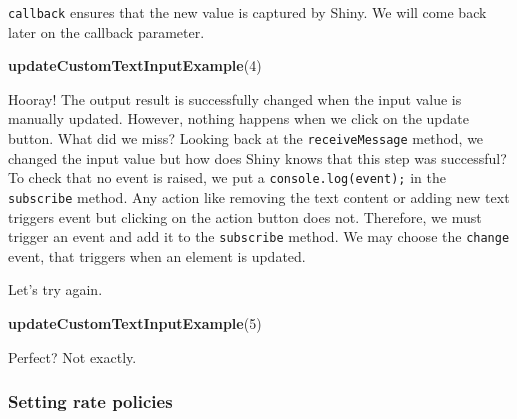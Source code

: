 \documentclass[
]{book}
\newenvironment{Shaded}{\begin{snugshade}}{\end{snugshade}}
\newcommand{\AttributeTok}[1]{\textcolor[rgb]{0.77,0.63,0.00}{#1}}
\newcommand{\DecValTok}[1]{\textcolor[rgb]{0.00,0.00,0.81}{#1}}
\newcommand{\KeywordTok}[1]{\textcolor[rgb]{0.13,0.29,0.53}{\textbf{#1}}}
\newcommand{\NormalTok}[1]{#1}
\newcommand{\OperatorTok}[1]{\textcolor[rgb]{0.81,0.36,0.00}{\textbf{#1}}}
\newcommand{\StringTok}[1]{\textcolor[rgb]{0.31,0.60,0.02}{#1}}
\begin{document}
\texttt{callback} ensures that the new value is captured by Shiny. We will come back later on the callback parameter.

\begin{Shaded}
\begin{Highlighting}[]
\KeywordTok{updateCustomTextInputExample}\NormalTok{(}\DecValTok{4}\NormalTok{)}
\end{Highlighting}
\end{Shaded}

Hooray! The output result is successfully changed when the input value is manually updated. However, nothing happens when we click on the update button. What did we miss? Looking back at the \texttt{receiveMessage} method, we changed the input value but how does Shiny knows that this step was successful? To check that no event is raised, we put a \texttt{console.log(event);} in the \texttt{subscribe} method. Any action like removing the text content or adding new text triggers event but clicking on the action button does not. Therefore, we must trigger an event and add it to the \texttt{subscribe} method. We may choose the \texttt{change} event, that triggers when an element is updated.

\begin{Shaded}
\end{Shaded}

Let's try again.

\begin{Shaded}
\begin{Highlighting}[]
\KeywordTok{updateCustomTextInputExample}\NormalTok{(}\DecValTok{5}\NormalTok{)}
\end{Highlighting}
\end{Shaded}

Perfect? Not exactly.

\hypertarget{setting-rate-policies}{%
\subsubsection{Setting rate policies}\label{setting-rate-policies}}
\end{document}
